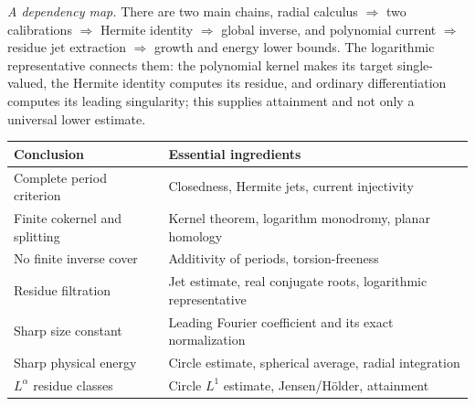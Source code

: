 \documentclass[11pt,a4paper]{article}
\numberwithin{equation}{section}
\theoremstyle{definition}
\theoremstyle{remark}
\theoremstyle{plain}
\begin{document}
\emph{A dependency map.} There are two main chains, radial calculus
$\Rightarrow$ two calibrations $\Rightarrow$ Hermite identity $\Rightarrow$
global inverse, and polynomial current $\Rightarrow$ residue jet extraction
$\Rightarrow$ growth and energy lower bounds. The logarithmic representative
connects them: the polynomial kernel makes its target single-valued, the
Hermite identity computes its residue, and ordinary differentiation computes
its leading singularity; this supplies attainment and not only a universal
lower estimate.

\begin{center}
\small
\begin{tabular}{@{}p{}p{}@{}}
\toprule
Conclusion & Essential ingredients\\
\midrule
Complete period criterion & Closedness, Hermite jets, current injectivity\\
Finite cokernel and splitting & Kernel theorem, logarithm monodromy, planar
 homology\\
No finite inverse cover & Additivity of periods, torsion-freeness\\
Residue filtration & Jet estimate, real conjugate roots, logarithmic
 representative\\
Sharp size constant & Leading Fourier coefficient and its exact
 normalization\\
Sharp physical energy & Circle estimate, spherical average, radial
 integration\\
$L^\alpha$ residue classes & Circle $L^1$ estimate, Jensen/H\"older,
 attainment\\
\bottomrule
\end{tabular}
\end{center}
\end{document}
